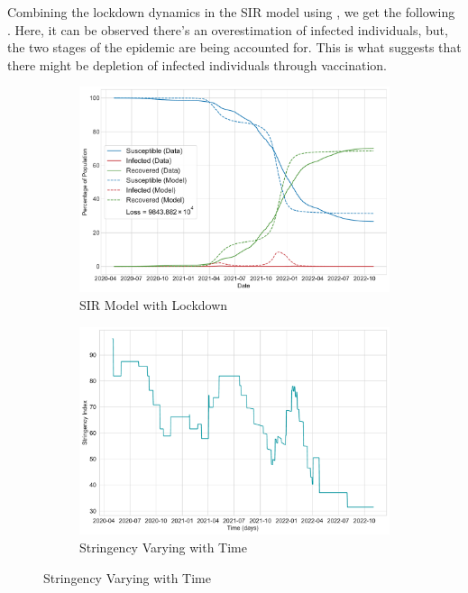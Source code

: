 \documentclass[tikz,fleqn,12pt]{wlscirep}
\begin{document}
Combining the lockdown dynamics in the SIR model using , we get the following . Here, it can be observed there's an overestimation of infected individuals, but, the two stages of the epidemic are being accounted for. This is what suggests that there might be depletion of infected individuals through vaccination.

\begin{figure}[htbp!]
  \centering
  \begin{subfigure}[t]{\textwidth}
    \centering
    \includegraphics[scale=0.50]{images/SIR_model_with_lockdown_IND.pdf}
    \caption{SIR Model with Lockdown}
    \label{fig:SIR_model_with_lockdown_IND}
  \end{subfigure}
  
  \begin{subfigure}[t]{\textwidth}
    \centering
    \includegraphics[scale=0.50]{images/stringency_varying_with_time_IND.pdf}
    \caption{Stringency Varying with Time}
    \label{fig:stringency_varying_with_time_IND}
  \end{subfigure}
\end{figure}
\end{document}
